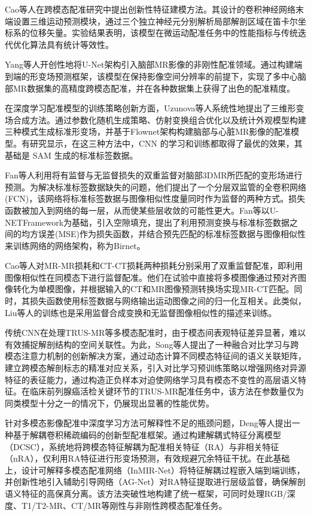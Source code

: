 Cao等人在跨模态配准研究中提出创新性特征建模方法。其设计的卷积神经网络末端设置三维运动预测模块，通过三个独立神经元分别解析局部解剖区域在笛卡尔坐标系的位移矢量。实验结果表明，该模型在微运动配准任务中的性能指标与传统迭代优化算法具有统计等效性\cite{cao2018deep}。

Yang等人开创性地将U-Net架构引入脑部MR影像的非刚性配准领域。通过构建端到端的形变场预测框架，该模型在保持影像空间分辨率的前提下，实现了多中心脑部MR数据集的高精度跨模态配准，并在各种数据集上获得了出色的配准精度\cite{yang2017quicksilver}。

在深度学习配准模型的训练策略创新方面，Uzunova等人系统性地提出了三维形变场合成方法\cite{uzunova2017training}。通过参数化随机生成策略、仿射变换组合优化以及统计外观模型构建三种模式生成标准形变场，并基于Flownet架构\cite{dosovitskiy2015flownet}构建脑部与心脏MR影像的配准模型。有研究显示，在这三种方法中，CNN 的学习和训练都取得了最优的效果，其基础是 SAM 生成的标准标签数据。

Fan等人利用将有监督与无监督损失的双重监督对脑部3DMR所匹配的变形场进行预测。为解决标准标签数据缺失的问题，他们提出了一个分层双监管的全卷积网络(FCN)\cite{long2015fully}，该网络将标准标签数据与图像相似性度量同时作为监督的两种方式。损失函数被加入到网络的每一层，从而使某些层收敛的可能性更大。Fan等以U-NETFramework\cite{ronneberger2015u}为基础，引入空隙填充，提出了利用预测变换与标准标签数据之间的均方误差(MSE)作为损失函数，并结合预先匹配的标准标签数据与图像相似性来训练网络的网络架构，称为Birnet。

Cao等人对MR-MR损耗和CT-CT损耗两种损耗分别采用了双重监督配准\cite{cao2018deep}，即利用图像相似性在同模态下进行监督配准。他们在试验中直接将多模图像通过预对齐图像转化为单模图像，并根据输入的CT和MR图像预测转换场实现MR-CT匹配。同时，其损失函数使用标签数据与网络输出运动图像之间的归一化互相关。此类似，Liu等人的训练也是采用监督合成变换和无监督图像相似性的描述来训练\cite{liu2019multimodal}。

传统CNN在处理TRUS-MR等多模态配准时，由于模态间表观特征差异显著，难以有效捕捉解剖结构的空间关联性。为此，Song等人\cite{song2022cross}提出了一种融合对比学习与跨模态注意力机制的创新解决方案，通过动态计算不同模态特征间的语义关联矩阵，建立跨模态解剖标志的精准对应关系，引入对比学习预训练策略以增强网络对异源特征的表征能力，通过构造正负样本对迫使网络学习具有模态不变性的高层语义特征。在临床前列腺癌活检关键环节的TRUS-MR配准任务中，该方法在参数量仅为同类模型十分之一的情况下，仍展现出显著的性能优势。

针对多模态影像配准中深度学习方法可解释性不足的瓶颈问题，Deng等人提出一种基于解耦卷积稀疏编码的创新型配准框架\cite{deng2023interpretable}。通过构建解耦式特征分离模型（DCSC），系统地将跨模态特征解耦为配准相关特征（RA）与非相关特征（nRA），仅利用RA特征进行形变场预测，有效规避冗余特征干扰。在此基础上，设计可解释多模态配准网络（InMIR-Net）将特征解耦过程嵌入端到端训练，并创新性地引入辅助引导网络（AG-Net）对RA特征提取进行层级监督，确保解剖语义特征的高保真分离。该方法突破性地构建了统一框架，可同时处理RGB/深度、T1/T2-MR、CT/MR等刚性与非刚性跨模态配准任务。

